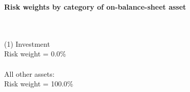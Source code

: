 \documentclass{article}
\begin{document}
\setlength{\parindent}{0em}
\begin{center}{\bf Risk weights by category of on-balance-sheet asset}\end{center}
~\\
~\\

(1) Investment\\
Risk weight = 0.0\%\\

~\\
All other assets:\\
Risk weight = 100.0\%\\

~\\
\end{document}
